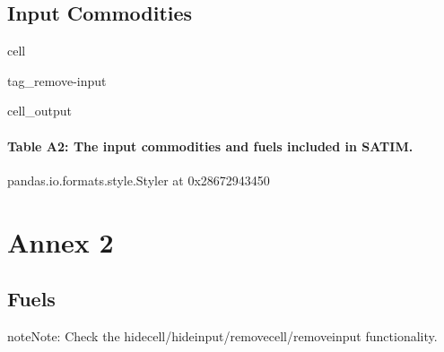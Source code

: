 \documentclass[letterpaper,10pt,english]{jupyterBook}
\begin{document}
\section{Input Commodities}
\label{\detokenize{Annex 1 Techs:input-commodities}}
\begin{sphinxuseclass}{cell}
\begin{sphinxuseclass}{tag_remove-input}\begin{sphinxVerbatimOutput}

\begin{sphinxuseclass}{cell_output}\subsubsection*{Table A2: The input commodities and fuels included in SATIM.}

\begin{sphinxVerbatim}[commandchars=\\\{\}]
\PYGZlt{}pandas.io.formats.style.Styler at 0x28672943450\PYGZgt{}
\end{sphinxVerbatim}

\end{sphinxuseclass}\end{sphinxVerbatimOutput}

\end{sphinxuseclass}
\end{sphinxuseclass}
\sphinxstepscope


\chapter{Annex 2}
\label{\detokenize{Annex 2 Fuels:annex-2}}\label{\detokenize{Annex 2 Fuels::doc}}

\section{Fuels}
\label{\detokenize{Annex 2 Fuels:fuels}}
\begin{sphinxadmonition}{note}{Note:}
\sphinxAtStartPar
Check the hide\sphinxhyphen{}cell/hide\sphinxhyphen{}input/remove\sphinxhyphen{}cell/remove\sphinxhyphen{}input functionality.
\end{sphinxadmonition}
\end{document}
